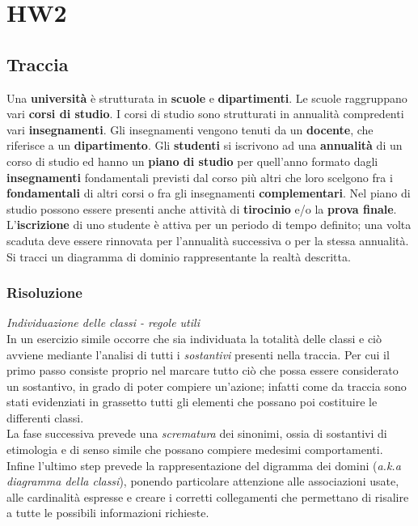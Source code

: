 \documentclass{article}
\begin{document}
\pagestyle{empty}

\section*{HW2}
\large

\subsection*{Traccia}
\large
Una \textbf{università} è strutturata in \textbf{scuole} e \textbf{dipartimenti}. Le scuole raggruppano vari \textbf{corsi di studio}. I corsi di studio sono strutturati in annualità compredenti vari \textbf{insegnamenti}. Gli insegnamenti vengono tenuti da un \textbf{docente}, che riferisce a un \textbf{dipartimento}. Gli \textbf{studenti} si iscrivono ad una \textbf{annualità} di un corso di studio ed hanno un \textbf{piano di studio} per quell'anno formato dagli \textbf{insegnamenti} fondamentali previsti dal corso più altri che loro scelgono fra i \textbf{fondamentali} di altri corsi o fra gli insegnamenti \textbf{complementari}. Nel piano di studio possono essere presenti anche attività di \textbf{tirocinio} e/o la \textbf{prova finale}. L'\textbf{iscrizione} di uno studente è attiva per un periodo di tempo definito; una volta scaduta deve essere rinnovata per l'annualità successiva o per la stessa annualità. Si tracci un diagramma di dominio rappresentante la realtà descritta.

\subsubsection*{Risoluzione}
\large
\textit{Individuazione delle classi - regole utili}\\
In un esercizio simile occorre che sia individuata la totalità delle classi e ciò avviene mediante l'analisi di tutti i \textit{sostantivi} presenti nella traccia. Per cui il primo passo consiste proprio nel marcare tutto ciò che possa essere considerato un sostantivo, in grado di poter compiere un'azione; infatti come da traccia sono stati evidenziati in grassetto tutti gli elementi che possano poi costituire le differenti classi.\vspace*{14pt}\\
La fase successiva prevede una \textit{scrematura} dei sinonimi, ossia di sostantivi di etimologia e di senso simile che possano compiere medesimi comportamenti.\\
Infine l'ultimo step prevede la rappresentazione del digramma dei domini (\textit{a.k.a diagramma della classi}), ponendo particolare attenzione alle associazioni usate, alle cardinalità espresse e creare i corretti collegamenti che permettano di risalire a tutte le possibili informazioni richieste.
\end{document}
